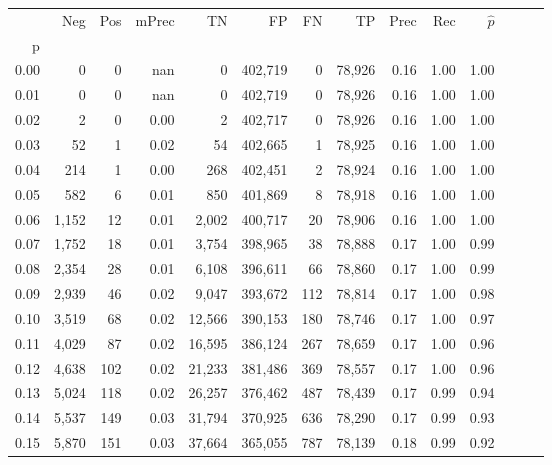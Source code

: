 \begin{tabular}{rrrrrrrrrrrrrr}
\toprule
{} &    Neg &    Pos & mPrec &       TN &       FP &      FN &      TP &  Prec &   Rec & $\hat{p}$ \\
p    &        &        &       &          &          &         &         &       &       &           \\
\midrule
0.00 &      0 &      0 &   nan &        0 &  402,719 &       0 &  78,926 &  0.16 &  1.00 &      1.00 \\
0.01 &      0 &      0 &   nan &        0 &  402,719 &       0 &  78,926 &  0.16 &  1.00 &      1.00 \\
0.02 &      2 &      0 &  0.00 &        2 &  402,717 &       0 &  78,926 &  0.16 &  1.00 &      1.00 \\
0.03 &     52 &      1 &  0.02 &       54 &  402,665 &       1 &  78,925 &  0.16 &  1.00 &      1.00 \\
0.04 &    214 &      1 &  0.00 &      268 &  402,451 &       2 &  78,924 &  0.16 &  1.00 &      1.00 \\
0.05 &    582 &      6 &  0.01 &      850 &  401,869 &       8 &  78,918 &  0.16 &  1.00 &      1.00 \\
0.06 &  1,152 &     12 &  0.01 &    2,002 &  400,717 &      20 &  78,906 &  0.16 &  1.00 &      1.00 \\
0.07 &  1,752 &     18 &  0.01 &    3,754 &  398,965 &      38 &  78,888 &  0.17 &  1.00 &      0.99 \\
0.08 &  2,354 &     28 &  0.01 &    6,108 &  396,611 &      66 &  78,860 &  0.17 &  1.00 &      0.99 \\
0.09 &  2,939 &     46 &  0.02 &    9,047 &  393,672 &     112 &  78,814 &  0.17 &  1.00 &      0.98 \\
0.10 &  3,519 &     68 &  0.02 &   12,566 &  390,153 &     180 &  78,746 &  0.17 &  1.00 &      0.97 \\
0.11 &  4,029 &     87 &  0.02 &   16,595 &  386,124 &     267 &  78,659 &  0.17 &  1.00 &      0.96 \\
0.12 &  4,638 &    102 &  0.02 &   21,233 &  381,486 &     369 &  78,557 &  0.17 &  1.00 &      0.96 \\
0.13 &  5,024 &    118 &  0.02 &   26,257 &  376,462 &     487 &  78,439 &  0.17 &  0.99 &      0.94 \\
0.14 &  5,537 &    149 &  0.03 &   31,794 &  370,925 &     636 &  78,290 &  0.17 &  0.99 &      0.93 \\
0.15 &  5,870 &    151 &  0.03 &   37,664 &  365,055 &     787 &  78,139 &  0.18 &  0.99 &      0.92 \\

\end{tabular}
